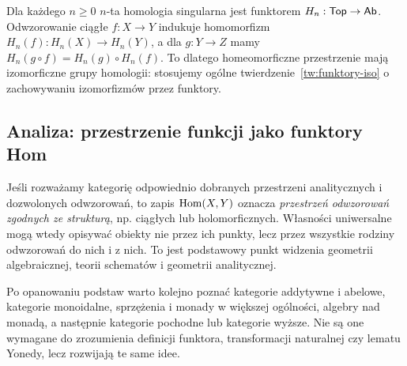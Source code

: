 \begin{przyklad}
Dla każdego $n\geq0$ $n$-ta homologia singularna jest funktorem $H_n:\mathsf{Top}\to\mathsf{Ab}$. Odwzorowanie ciągłe $f:X\to Y$ indukuje homomorfizm $H_n(f):H_n(X)\to H_n(Y)$, a dla $g:Y\to Z$ mamy $H_n(g\circ f)=H_n(g)\circ H_n(f)$. To dlatego homeomorficzne przestrzenie mają izomorficzne grupy homologii: stosujemy ogólne twierdzenie~\ref{tw:funktory-iso} o zachowywaniu izomorfizmów przez funktory.
\end{przyklad}

\subsection{Analiza: przestrzenie funkcji jako funktory Hom}

Jeśli rozważamy kategorię odpowiednio dobranych przestrzeni analitycznych i dozwolonych odwzorowań, to zapis $\operatorname{Hom}(X,Y)$ oznacza \emph{przestrzeń odwzorowań zgodnych ze strukturą}, np. ciągłych lub holomorficznych. Własności uniwersalne mogą wtedy opisywać obiekty nie przez ich punkty, lecz przez wszystkie rodziny odwzorowań do nich i z nich. To jest podstawowy punkt widzenia geometrii algebraicznej, teorii schematów i geometrii analitycznej.

\begin{uwaga}
Po opanowaniu podstaw warto kolejno poznać kategorie addytywne i abelowe, kategorie monoidalne, sprzężenia i monady w większej ogólności, algebry nad monadą, a następnie kategorie pochodne lub kategorie wyższe. Nie są one wymagane do zrozumienia definicji funktora, transformacji naturalnej czy lematu Yonedy, lecz rozwijają te same idee.
\end{uwaga}

